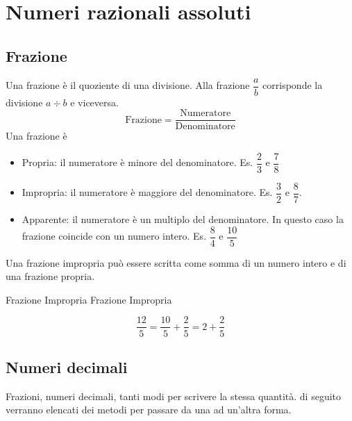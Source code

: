 \chapter{Numeri razionali assoluti}
\label{cha:NumeriRazionaliAssoluti}
\section{Frazione}
\label{sec:fraczioniNumRazASS}
Una frazione è il quoziente di una divisione. Alla frazione $\dfrac{a}{b}$ corrisponde la divisione $a\div b$ e viceversa.
\[
\text{Frazione}=
\dfrac{\text{Numeratore}}{\text{Denominatore}}
\]
Una frazione è\begin{itemize}
	\item Propria: il numeratore è minore del denominatore. Es. $\dfrac{2}{3}$ e $\dfrac{7}{8}$
	\item Impropria: il numeratore è maggiore del denominatore. Es. $\dfrac{3}{2}$ e $\dfrac{8}{7}$.
	\item Apparente: il numeratore è un multiplo del denominatore. In questo caso la frazione coincide con un numero intero. Es. $\dfrac{8}{4}$ e $\dfrac{10}{5}$
\end{itemize}
	Una frazione impropria può essere scritta come somma di un numero intero e di una frazione propria. 
	\begin{esempiot}{Frazione Impropria}{}
	Frazione Impropria
	  \end{esempiot}
	\[\dfrac{12}{5}=\dfrac{10}{5}+\dfrac{2}{5}=2+\dfrac{2}{5}\] 
	\section{Numeri decimali}
Frazioni, numeri decimali, tanti modi per scrivere la stessa quantità. di seguito verranno elencati dei metodi per passare da una ad un'altra forma.
\label{Numeri decimali}
